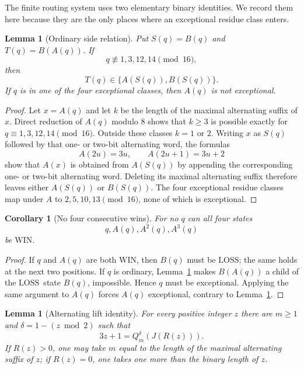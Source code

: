 \documentclass[11pt]{article}
\newtheorem{lemma}[theorem]{Lemma}
\newtheorem{corollary}[theorem]{Corollary}
\newcommand{\WIN}{\ensuremath{\mathrm{WIN}}}
\newcommand{\LOSS}{\ensuremath{\mathrm{LOSS}}}
\begin{document}
The finite routing system uses two elementary binary identities. We record
them here because they are the only places where an exceptional residue class
enters.

\begin{lemma}[Ordinary side relation]\label{lem:side}
Put $S(q)=B(q)$ and $T(q)=B(A(q))$. If
\[
  q\not\equiv1,3,12,14\pmod{16},
\]
then
\[
  T(q)\in\{A(S(q)),B(S(q))\}.
\]
If $q$ is in one of the four exceptional classes, then $A(q)$ is not
exceptional.
\end{lemma}

\begin{proof}
Let $x=A(q)$ and let $k$ be the length of the maximal alternating suffix of
$x$. Direct reduction of $A(q)$ modulo $8$ shows that $k\ge3$ is possible
exactly for $q\equiv1,3,12,14\pmod{16}$. Outside these classes $k=1$ or
$2$. Writing $x$ as $S(q)$ followed by that one- or two-bit alternating word,
the formulas
\[
  A(2u)=3u,\qquad A(2u+1)=3u+2
\]
show that $A(x)$ is obtained from $A(S(q))$ by appending the corresponding
one- or two-bit alternating word. Deleting its maximal alternating suffix
therefore leaves either $A(S(q))$ or $B(S(q))$. The four exceptional residue
classes map under $A$ to $2,5,10,13\pmod{16}$, none of which is exceptional.
\end{proof}

\begin{corollary}[No four consecutive wins]\label{cor:no-four-win}
For no $q$ can all four states
\[
  q,A(q),A^2(q),A^3(q)
\]
be \WIN.
\end{corollary}

\begin{proof}
If $q$ and $A(q)$ are both \WIN, then $B(q)$ must be \LOSS; the same holds at
the next two positions. If $q$ is ordinary, Lemma~\ref{lem:side} makes
$B(A(q))$ a child of the \LOSS\ state $B(q)$, impossible. Hence $q$ must be
exceptional. Applying the same argument to $A(q)$ forces $A(q)$ exceptional,
contrary to Lemma~\ref{lem:side}.
\end{proof}

\begin{lemma}[Alternating lift identity]\label{lem:alt-lift}
For every positive integer $z$ there are $m\ge1$ and
$\delta=1-(z\bmod2)$ such that
\[
  3z+1=Q_m^\delta(J(R(z))).
\]
If $R(z)>0$, one may take $m$ equal to the length of the maximal alternating
suffix of $z$; if $R(z)=0$, one takes one more than the binary length of $z$.
\end{lemma}
\end{document}
